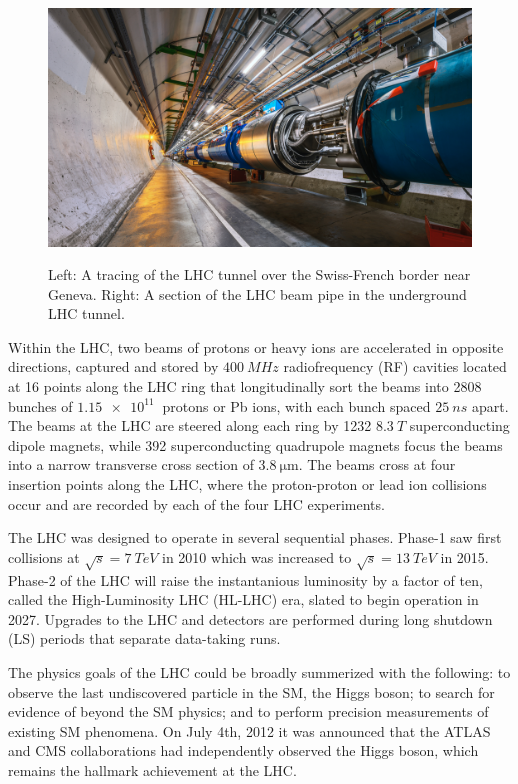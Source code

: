 \begin{figure}[H]
{    \includegraphics[height=\textwidth]{Images/CMS/LHCpipe.jpg}
    }
    \caption{Left: A tracing of the LHC tunnel over the Swiss-French border near Geneva. Right: A section of the LHC beam pipe in the underground LHC tunnel.}
    \label{fig:LHC}
\end{figure}

Within the LHC, two beams of protons or heavy ions are accelerated in opposite directions, captured and stored by $\SI{400}{MHz}$ radiofrequency (RF) cavities located at 16 points along the LHC ring that longitudinally sort the beams into 2808 bunches of $\SI{1.15e11}{}$ protons or Pb ions, with each bunch spaced $\SI{25}{ns}$ apart. The beams at the LHC are steered along each ring by 1232 $\SI{8.3}{T}$ superconducting dipole magnets, while 392 superconducting quadrupole magnets focus the beams into a narrow transverse cross section of $\SI{3.8}{\micro\meter}$. The beams cross at four insertion points along the LHC, where the proton-proton or lead ion collisions occur and are recorded by each of the four LHC experiments.

The LHC was designed to operate in several sequential phases. Phase-1 saw first collisions at $\sqrt{s}=\SI{7}{TeV}$ in 2010 which was increased to $\sqrt{s}=\SI{13}{TeV}$ in 2015. Phase-2 of the LHC will raise the instantanious luminosity by a factor of ten, called the High-Luminosity LHC (HL-LHC) era, slated to begin operation in 2027. Upgrades to the LHC and detectors are performed during long shutdown (LS) periods that separate data-taking runs.

The physics goals of the LHC could be broadly summerized with the following: to observe the last undiscovered particle in the SM, the Higgs boson; to search for evidence of beyond the SM physics; and to perform precision measurements of existing SM phenomena. On July 4th, 2012 it was announced that the ATLAS and CMS collaborations had independently observed the Higgs boson, which remains the hallmark achievement at the LHC.